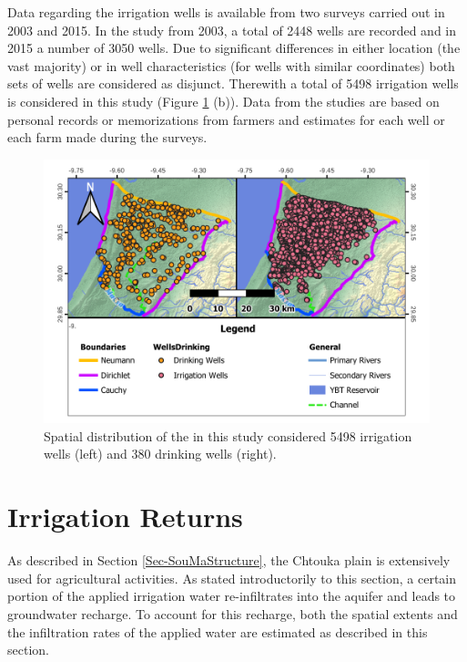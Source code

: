 Data regarding the irrigation wells is available from two surveys carried out in 2003 and 2015. 
In the study from 2003, a total of 2448 wells are recorded and in 2015 a number of 3050 wells. 
Due to significant differences in either location (the vast majority) or in well characteristics (for wells with similar coordinates) both sets of wells are considered as disjunct. 
Therewith a total of 5498 irrigation wells is considered in this study (Figure \ref{Map-PumpWells} (b)). 
Data from the studies are based on personal records or memorizations from farmers and estimates for each well or each farm made during the surveys.

\begin{figure}[h]
    \centering
    \includegraphics{./img/Map_IrrDri.pdf}
    \caption{Spatial distribution of the in this study considered 5498 irrigation wells (left) and 380 drinking wells (right).}
    \label{Map-PumpWells}
\end{figure}


\section{Irrigation Returns}
\label{Sec-IrrRech}

As described in Section \ref{Sec-SouMaStructure}, the Chtouka plain is extensively used for agricultural activities. 
As stated introductorily to this section, a certain portion of the applied irrigation water re-infiltrates into the aquifer and leads to groundwater recharge. 
To account for this recharge, both the spatial extents and the infiltration rates of the applied water are estimated as described in this section.

